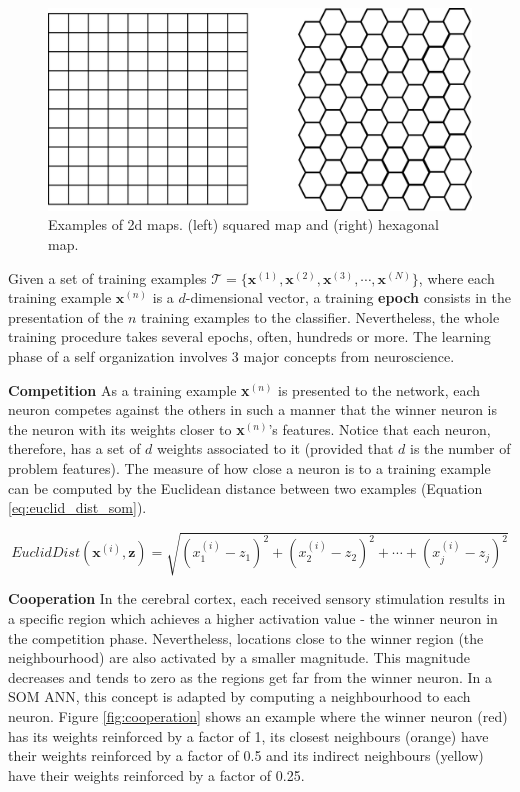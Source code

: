 \begin{figure}[h]
\centering
\includegraphics[scale=0.08]{figs/maps.eps}
\caption{Examples of 2d maps. (left) squared map and (right) hexagonal map.}
\label{fig:topologic}
\end{figure}

Given a set of training examples $\mathcal{T} = \{\mathbf{x}^{(1)},\mathbf{x}^{(2)},\mathbf{x}^{(3)},\cdots,\mathbf{x}^{(N)}\}$, where each training example $\mathbf{x}^{(n)}$ is a $d$-dimensional vector, a training \textbf{epoch} consists in the presentation of the $n$ training examples to the classifier. Nevertheless, the whole training procedure takes several epochs, often, hundreds or more. The learning phase of a self organization involves 3 major concepts from neuroscience.
\vspace{0.2cm}

\noindent\textbf{Competition} As a training example \textbf{x}$^{(n)}$ is presented to the network, each neuron competes against the others in such a manner that the winner neuron is the neuron with its weights closer to \textbf{x}$^{(n)}$'s features. Notice that each neuron, therefore, has a set of $d$ weights associated to it (provided that $d$ is the number of problem features). The measure of how close a neuron is to a training example can be computed by the Euclidean distance between two examples (Equation \ref{eq:euclid_dist_som}).

\begin{equation}
    EuclidDist(\textbf{x}^{(i)},\textbf{z}) = \sqrt{(x^{(i)}_{1} - z_1)^{2} + (x^{(i)}_{2} - z_2)^{2} + \cdots + (x^{(i)}_j - z_j)^{2}}
    \label{eq:euclid_dist_som}
\end{equation}

\vspace{0.2cm}

\noindent\textbf{Cooperation} In the cerebral cortex, each received sensory stimulation results in a specific region which achieves a higher activation value - the winner neuron in the competition phase. Nevertheless, locations close to the winner region (the neighbourhood) are also activated by a smaller magnitude. This magnitude decreases and tends to zero as the regions get far from the winner neuron. In a SOM ANN, this concept is adapted by computing a neighbourhood to each neuron. Figure \ref{fig:cooperation} shows an example where the winner neuron (red) has its weights reinforced by a factor of 1, its closest neighbours (orange) have their weights reinforced by a factor of 0.5 and its indirect neighbours (yellow) have their weights reinforced by a factor of 0.25. 

